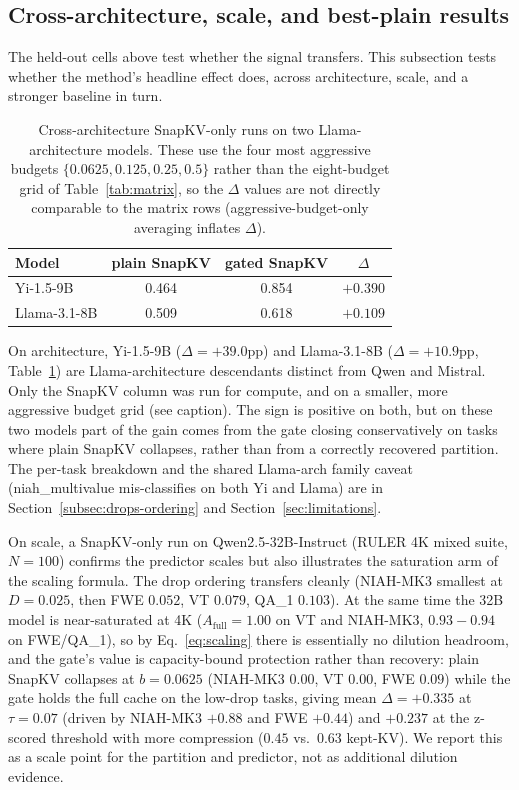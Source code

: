 \subsection{Cross-architecture, scale, and best-plain results}

The held-out cells above test whether the signal transfers. This
subsection tests whether the method's headline effect does, across
architecture, scale, and a stronger baseline in turn.

\begin{table}[t]
\centering
\caption{Cross-architecture SnapKV-only runs on two Llama-architecture models.
These use the four most aggressive budgets $\{0.0625, 0.125, 0.25, 0.5\}$
rather than the eight-budget grid of Table~\ref{tab:matrix}, so the
$\Delta$ values are not directly comparable to the matrix rows
(aggressive-budget-only averaging inflates $\Delta$).}
\label{tab:crossarch}
\begin{tabular}{lccc}
\toprule
Model & plain SnapKV & gated SnapKV & $\Delta$ \\
\midrule
Yi-1.5-9B    & 0.464 & 0.854 & $+0.390$ \\
Llama-3.1-8B & 0.509 & 0.618 & $+0.109$ \\
\bottomrule
\end{tabular}
\end{table}

On architecture, Yi-1.5-9B ($\Delta = +39.0$pp) and Llama-3.1-8B
($\Delta = +10.9$pp, Table~\ref{tab:crossarch}) are Llama-architecture
descendants distinct from Qwen and Mistral. Only the SnapKV column was
run for compute, and on a smaller, more aggressive budget grid (see
caption). The sign is positive on both, but on these two models part of
the gain comes from the gate closing conservatively on tasks where
plain SnapKV collapses, rather than from a correctly recovered
partition. The per-task breakdown and the shared Llama-arch family
caveat (niah\_multivalue mis-classifies on both Yi and Llama) are in
Section~\ref{subsec:drops-ordering} and Section~\ref{sec:limitations}.

On scale, a SnapKV-only run on Qwen2.5-32B-Instruct (RULER 4K mixed
suite, $N = 100$) confirms the predictor scales but also illustrates the
saturation arm of the scaling formula. The drop ordering transfers
cleanly (NIAH-MK3 smallest at $D = 0.025$, then FWE $0.052$, VT
$0.079$, QA\_1 $0.103$). At the same time the 32B model is
near-saturated at 4K ($A_{\mathrm{full}} = 1.00$ on VT and NIAH-MK3,
$0.93-0.94$ on FWE/QA\_1), so by Eq.~\eqref{eq:scaling} there is
essentially no dilution headroom, and the gate's value is
capacity-bound protection rather than recovery: plain SnapKV collapses
at $b = 0.0625$ (NIAH-MK3 $0.00$, VT $0.00$, FWE $0.09$) while the gate
holds the full cache on the low-drop tasks, giving mean $\Delta =
+0.335$ at $\tau = 0.07$ (driven by NIAH-MK3 $+0.88$ and FWE $+0.44$)
and $+0.237$ at the z-scored threshold with more compression ($0.45$
vs.\ $0.63$ kept-KV). We report this as a scale point for the partition
and predictor, not as additional dilution evidence.

